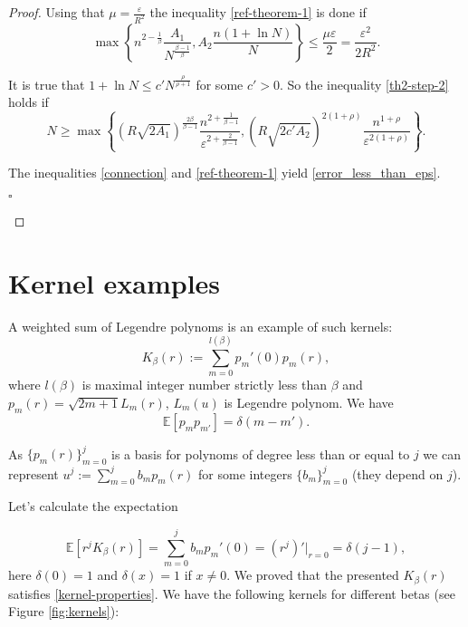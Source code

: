 \documentclass[runningheads]{llncs}
\newcommand{\EndProof}{\begin{flushright}$\square$\end{flushright}}
\begin{document}
\begin{proof}
Using that $\mu=\frac{\varepsilon}{R^2}$ the inequality \eqref{ref-theorem-1} is done if
\begin{equation}\label{th2-step-2}
    \max\left\{n^{2-\frac{1}{\beta}}\dfrac{A_1}{N^{\frac{\beta-1}{\beta}}}, A_2\dfrac{n(1+\ln{N})}{N} \right\} 
    \leq \dfrac{\mu \varepsilon}{2}
    = \dfrac{\varepsilon^2}{2R^2} .
\end{equation}

It is true that  $1 + \ln N \leq c' N^{\frac{\rho}{\rho + 1}}$ for some $c' > 0$. So the inequality \eqref{th2-step-2} holds if
\begin{equation}
    N \geq \max\left\{ \left(R\sqrt{2A_1}\right)^{\frac{2\beta}{\beta-1}}\dfrac{n^{2+\frac{1}{\beta-1}}}{\varepsilon^{2+\frac{2}{\beta-1}}},\left(R\sqrt{2c'A_2}\right)^{2(1+\rho)}\dfrac{n^{1+\rho}}{\varepsilon^{2(1+\rho)}}\right\}.
\end{equation}

The inequalities \eqref{connection} and \eqref{ref-theorem-1} yield \eqref{error_less_than_eps}.
\EndProof
\end{proof}

\section{Kernel examples}\label{appendix:kernels}


A weighted sum of Legendre polynoms is an example of such kernels:
\begin{equation}\label{kernels}
    K_{\beta}(r) := \sum\limits_{m=0}^{l(\beta)} p_{m}'(0)p_m(r),
\end{equation}
where $l(\beta)$ is maximal integer number strictly less than $\beta$ and $p_m(r) = \sqrt{2m+1} L_m(r)$, $L_m(u)$ is Legendre polynom. We have
\begin{equation*}
    \mathbb E \left[ p_m p_{m'}\right]=\delta(m-m').
\end{equation*}

As $\{p_m(r)\}_{m=0}^{j}$ is a basis for polynoms of degree less than or equal to $j$ we can represent $u^j := \sum\limits_{m=0}^{j} b_m p_m(r)$ for some integers $\{b_m\}_{m=0}^{j}$ (they depend on $j$). 

Let's calculate the expectation

\begin{equation*}
    \mathbb E \left[ r^j K_{\beta}(r)\right] = \sum\limits_{m=0}^{j} b_m p_m'(0) = (r^j)'|_{r=0} = \delta(j-1),
\end{equation*}
here $\delta(0) = 1$ and $\delta(x) = 1$ if $x \neq 0$. We proved that the presented $K_{\beta}(r)$ satisfies \eqref{kernel-properties}. We have the following kernels for different betas (see Figure \ref{fig:kernels}):
\end{document}
